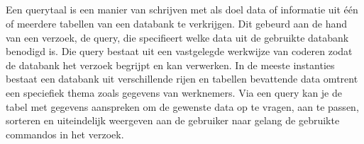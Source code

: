\subsection{}%
\label{sec:Querytaal}
Een querytaal is een manier van schrijven met als doel data of informatie uit één of meerdere tabellen van een databank te verkrijgen.
Dit gebeurd aan de hand van een verzoek, de query, die specifieert welke data uit de gebruikte databank benodigd is. Die query bestaat uit een vastgelegde werkwijze van coderen zodat de databank het verzoek begrijpt en kan verwerken. In de meeste instanties bestaat een databank uit verschillende rijen en tabellen bevattende data omtrent een speciefiek thema zoals gegevens van werknemers. Via een query kan je de tabel met gegevens aanspreken om de gewenste data op te vragen, aan te passen, sorteren en uiteindelijk weergeven aan de gebruiker naar gelang de gebruikte commandos in het verzoek.

\subsection{}%
\label{sec:graaf}


\subsection{}%
\label{sec:Uitvoering}


\subsection{}%
\label{sec:Gebruikservaring}


\subsection{}%
\label{sec:Architectuur}


\subsection{}%
\label{sec:API}